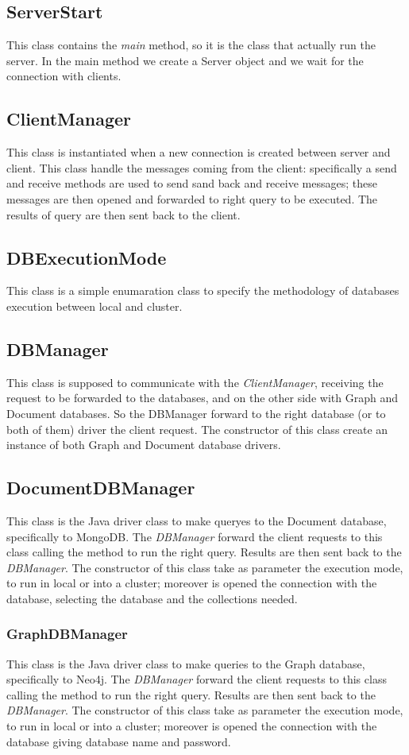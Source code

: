 \documentclass[11pt]{report}
\begin{document}
\subsection{ServerStart}
This class contains the \textit{main} method, so it is the class that actually run the server. In the main method we create a Server object and we wait for the connection with clients.
\subsection{ClientManager}
This class is instantiated when a new connection is created between server and client. This class handle the messages coming from the client: specifically a send and receive methods are used to send sand back and receive messages; these messages are then opened and forwarded to right query to be executed. The results of query are then sent back to the client.
\subsection{DBExecutionMode}
This class is a simple enumaration class to specify the methodology of databases execution between local and cluster.
\subsection{DBManager}
This class is supposed to communicate with the \textit{ClientManager}, receiving the request to be forwarded to the databases, and on the other side with Graph and Document databases. So the DBManager forward to the right database (or to both of them) driver the client request. The constructor of this class create an instance of both Graph and Document database drivers.
\subsection{DocumentDBManager}
This class is the Java driver class to make queryes to the Document database, specifically to MongoDB. The \textit{DBManager} forward the client requests to this class calling the method to run the right query. Results are then sent back to the \textit{DBManager}. The constructor of this class take as parameter the execution mode, to run in local or into a cluster; moreover is opened the connection with the database, selecting the database and the collections needed.
\subsubsection{GraphDBManager}
This class is the Java driver class to make queries to the Graph database, specifically to Neo4j. The \textit{DBManager} forward the client requests to this class calling the method to run the right query. Results are then sent back to the \textit{DBManager}. The constructor of this class take as parameter the execution mode, to run in local or into a cluster; moreover is opened the connection with the database giving database name and password.
\end{document}
